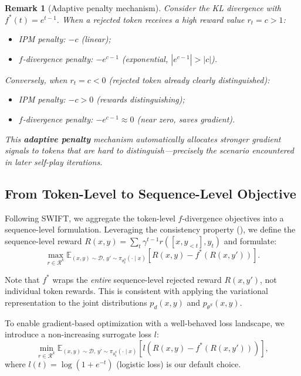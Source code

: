 \documentclass[11pt,a4paper]{article}
\newtheorem{remark}[theorem]{Remark}
\newcommand{\E}{\mathbb{E}}
\begin{document}
\begin{remark}[Adaptive penalty mechanism]
\label{rem:adaptive}
Consider the KL divergence with $f^*(t) = e^{t-1}$. When a rejected token receives a high reward value $r_t = c > 1$:
\begin{itemize}[nosep]
    \item IPM penalty: $-c$ (linear);
    \item $f$-divergence penalty: $-e^{c-1}$ (exponential, $|e^{c-1}| > |c|$).
\end{itemize}
Conversely, when $r_t = c < 0$ (rejected token already clearly distinguished):
\begin{itemize}[nosep]
    \item IPM penalty: $-c > 0$ (rewards distinguishing);
    \item $f$-divergence penalty: $-e^{c-1} \approx 0$ (near zero, saves gradient).
\end{itemize}
This \textbf{adaptive penalty} mechanism automatically allocates stronger gradient signals to tokens that are hard to distinguish---precisely the scenario encountered in later self-play iterations.
\end{remark}

\subsection{From Token-Level to Sequence-Level Objective}
\label{subsec:sequence_level}

Following SWIFT, we aggregate the token-level $f$-divergence objectives into a sequence-level formulation. Leveraging the consistency property (), we define the sequence-level reward $R(x, y) = \sum_t \gamma^{t-1} r([x, y_{<t}], y_t)$ and formulate:
\begin{equation}
    \max_{r \in \mathcal{R}^k} \E_{(x,y) \sim \mathcal{D},\, y' \sim \pi_{\theta^S_k}(\cdot \mid x)} \left[ R(x, y) - f^*\!\left(R(x, y')\right) \right].
    \label{eq:seq_f_div}
\end{equation}

Note that $f^*$ wraps the \emph{entire} sequence-level rejected reward $R(x, y')$, not individual token rewards. This is consistent with applying the variational representation to the joint distributions $p_d(x, y)$ and $p_{\theta^S}(x, y)$.

To enable gradient-based optimization with a well-behaved loss landscape, we introduce a non-increasing surrogate loss $l$:
\begin{equation}
    \min_{r \in \mathcal{R}^k} \E_{(x,y) \sim \mathcal{D},\, y' \sim \pi_{\theta^S_k}(\cdot \mid x)} \left[ l\!\left(R(x, y) - f^*\!\left(R(x, y')\right)\right) \right],
    \label{eq:general_objective}
\end{equation}
where $l(t) = \log(1 + e^{-t})$ (logistic loss) is our default choice.
\end{document}
